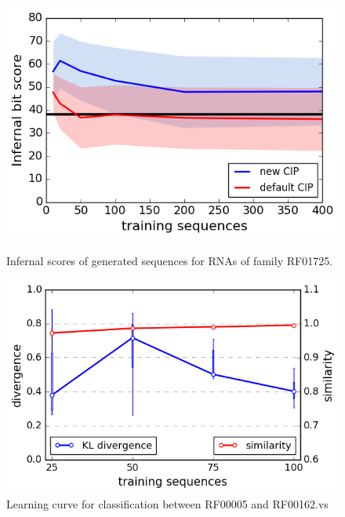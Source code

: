 \documentclass{article}
\begin{document}
\begin{figure}[ht]
      \centering
  \begin{minipage}[b]{0.47\textwidth}
    \includegraphics[width=\textwidth]{images/infernal_abstr.png}
    \caption{Infernal scores of generated sequences for RNAs of family RF01725.}
      \label{infeval}
  \end{minipage}
  \hfill
  \begin{minipage}[b]{0.50\textwidth}
    \includegraphics[width=\textwidth]{images/learningcurve.png}
    \caption{Learning curve for classification between RF00005 and RF00162.vs}
     \label{learncurve}
  \end{minipage}
\end{figure}


\end{document}
